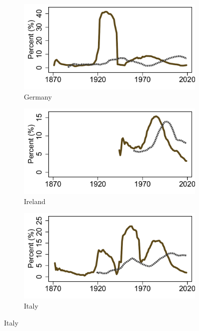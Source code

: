 \documentclass[12pt]{article}
\begin{document}
\begin{appendices}
\begin{singlespace}
\begin{figure}[ht]
\begin{subfigure}[b]{0.30\textwidth}
    \end{subfigure}
    \begin{subfigure}[b]{0.30\textwidth}
    \caption*{Germany}
    \includegraphics[width=\textwidth]{../Output/Figures/Median_dwn_unemp_Germany.pdf}   
    \end{subfigure} 
    \begin{subfigure}[b]{0.30\textwidth}
    \caption*{Ireland}
    \includegraphics[width=\textwidth]{../Output/Figures/Median_dwn_unemp_Ireland.pdf}   
    \end{subfigure} 
    \begin{subfigure}[b]{0.30\textwidth}
    \caption*{Italy}
    \includegraphics[width=\textwidth]{../Output/Figures/Median_dwn_unemp_Italy.pdf}   

\end{subfigure}
\end{figure}
\end{singlespace}
\end{appendices}
\end{document}
